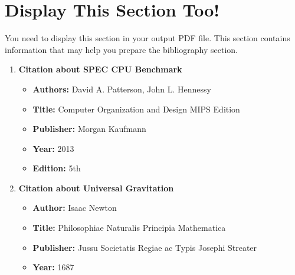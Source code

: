 \documentclass{article}
\begin{document}
\section*{Display This Section Too!}
You need to display this section in your output PDF file. This section contains information
that may help you prepare the bibliography section.
\begin{enumerate}
    \item \textbf{Citation about SPEC CPU Benchmark}
    \begin{itemize}
        \item \textbf{Authors:} David A. Patterson, John L. Hennessy
        \item \textbf{Title:} Computer Organization and Design MIPS Edition
        \item \textbf{Publisher:} Morgan Kaufmann
        \item \textbf{Year:} 2013
        \item \textbf{Edition:} 5th
    \end{itemize}
    \item \textbf{Citation about Universal Gravitation}
    \begin{itemize}
        \item \textbf{Author:} Isaac Newton
        \item \textbf{Title:} Philosophiae Naturalis Principia Mathematica
        \item \textbf{Publisher:} Jussu Societatis Regiae ac Typis Josephi Streater
        \item \textbf{Year:} 1687
    \end{itemize}
\end{enumerate}
\printbibliography
\end{document}
